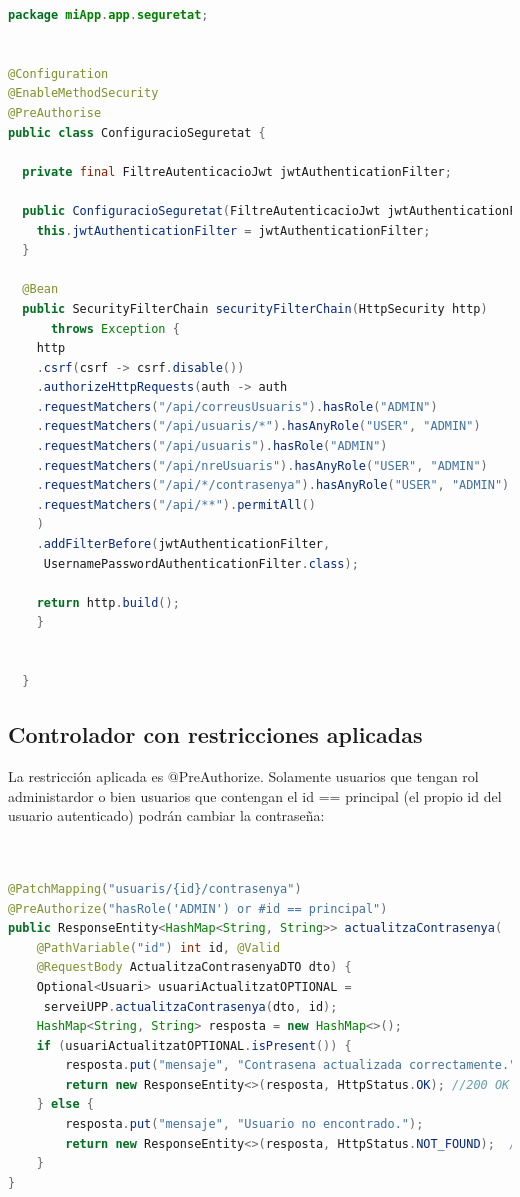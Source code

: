 \documentclass[a4paper,12pt]{report}
\begin{document}
				
		\begin{lstlisting}[language=java, basicstyle=\ttfamily\footnotesize, keywordstyle=\color{magenta}]
package miApp.app.seguretat;


@Configuration
@EnableMethodSecurity 
@PreAuthorise
public class ConfiguracioSeguretat {
	
  private final FiltreAutenticacioJwt jwtAuthenticationFilter;

  public ConfiguracioSeguretat(FiltreAutenticacioJwt jwtAuthenticationFilter) {
    this.jwtAuthenticationFilter = jwtAuthenticationFilter;
  }

  @Bean
  public SecurityFilterChain securityFilterChain(HttpSecurity http) 
      throws Exception {
	http
	.csrf(csrf -> csrf.disable())
	.authorizeHttpRequests(auth -> auth
	.requestMatchers("/api/correusUsuaris").hasRole("ADMIN")
	.requestMatchers("/api/usuaris/*").hasAnyRole("USER", "ADMIN")
	.requestMatchers("/api/usuaris").hasRole("ADMIN")                       
	.requestMatchers("/api/nreUsuaris").hasAnyRole("USER", "ADMIN")        
	.requestMatchers("/api/*/contrasenya").hasAnyRole("USER", "ADMIN")
	.requestMatchers("/api/**").permitAll()
	)
	.addFilterBefore(jwtAuthenticationFilter,
	 UsernamePasswordAuthenticationFilter.class);
	
	return http.build();
    }
	
	
  }
		\end{lstlisting}
	
	
	
		\subsection{Controlador con restricciones aplicadas}
		\label{sec:detallSeguretatControlador}
		
		La restricción aplicada es @PreAuthorize. Solamente usuarios que tengan rol administardor o bien usuarios que contengan el id == principal (el propio id del usuario autenticado) podrán cambiar la contraseña:
		
\begin{lstlisting}[language=java,  basicstyle=\ttfamily\footnotesize, keywordstyle=\color{magenta}]


@PatchMapping("usuaris/{id}/contrasenya")
@PreAuthorize("hasRole('ADMIN') or #id == principal") 
public ResponseEntity<HashMap<String, String>> actualitzaContrasenya(
	@PathVariable("id") int id, @Valid 
	@RequestBody ActualitzaContrasenyaDTO dto) {
	Optional<Usuari> usuariActualitzatOPTIONAL =
	 serveiUPP.actualitzaContrasenya(dto, id);
	HashMap<String, String> resposta = new HashMap<>(); 
	if (usuariActualitzatOPTIONAL.isPresent()) {
		resposta.put("mensaje", "Contrasena actualizada correctamente.");
		return new ResponseEntity<>(resposta, HttpStatus.OK); //200 OK
	} else {
		resposta.put("mensaje", "Usuario no encontrado.");
		return new ResponseEntity<>(resposta, HttpStatus.NOT_FOUND);  //404 NOT FOUND
	}
}

\end{lstlisting}
			
\end{document}
